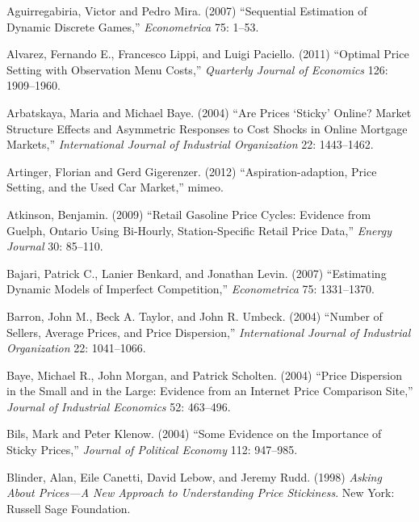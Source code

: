 \documentclass[11pt]{article}
\begin{document}
\begin{description}

\frenchspacing

\item Aguirregabiria, Victor and Pedro Mira. (2007) ``Sequential
  Estimation of Dynamic Discrete Games,'' {\it Econometrica} 75:
  1--53.

\item Alvarez, Fernando E., Francesco Lippi, and Luigi
  Paciello. (2011) ``Optimal Price Setting with Observation Menu
  Costs,'' {\it Quarterly Journal of Economics} 126: 1909--1960.

\item Arbatskaya, Maria and Michael Baye. (2004) ``Are Prices `Sticky'
  Online?  Market Structure Effects and Asymmetric Responses to Cost
  Shocks in Online Mortgage Markets,'' {\it International Journal of
    Industrial Organization} 22: 1443--1462.

\item Artinger, Florian and Gerd Gigerenzer. (2012)
  ``Aspiration-adaption, Price Setting, and the Used Car Market,''
  mimeo.

\item Atkinson, Benjamin. (2009) ``Retail Gasoline Price Cycles:
  Evidence from Guelph, Ontario Using Bi-Hourly, Station-Specific
  Retail Price Data,'' {\em Energy Journal} 30: 85--110.

\item Bajari, Patrick C., Lanier Benkard, and Jonathan Levin. (2007)
  ``Estimating Dynamic Models of Imperfect Competition,'' {\it
  Econometrica} 75: 1331--1370.

\item Barron, John M., Beck A. Taylor, and John R. Umbeck. (2004)
  ``Number of Sellers, Average Prices, and Price Dispersion,'' {\it
  International Journal of Industrial Organization} 22: 1041--1066.

\item Baye, Michael R., John Morgan, and Patrick Scholten. (2004)
  ``Price Dispersion in the Small and in the Large: Evidence from an
  Internet Price Comparison Site,'' {\it Journal of Industrial
    Economics} 52: 463--496.

\item Bils, Mark and Peter Klenow. (2004) ``Some Evidence on the
  Importance of Sticky Prices,'' {\it Journal of Political Economy}
  112: 947--985.

\item Blinder, Alan, Eile Canetti, David Lebow, and Jeremy
  Rudd. (1998) {\it Asking About Prices---A New Approach to
    Understanding Price Stickiness}.  New York: Russell Sage
  Foundation.


\end{description}
\end{document}
